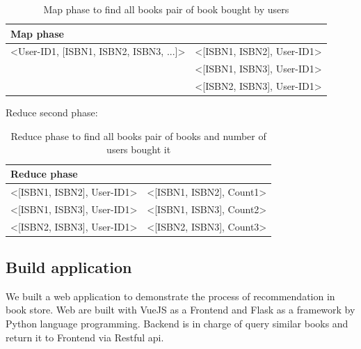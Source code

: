     \begin{table}[H]
        \centering
        \begin{tabular}{|l|l|}
            \hline
             \textbf{Map phase}      &  \\ \hline
             <User-ID1, [ISBN1, ISBN2, ISBN3, ...]> & <[ISBN1, ISBN2], User-ID1> \\
                               & <[ISBN1, ISBN3], User-ID1>\\
                               & <[ISBN2, ISBN3], User-ID1>\\ \hline
        \end{tabular}
        \caption{Map phase to find all books pair of book bought by users}
        \label{tab:my_label}
    \end{table}

Reduce second phase: 

    \begin{table}[H]
        \centering
        \begin{tabular}{|l|l|}
            \hline
            \textbf{Reduce phase} &  \\ \hline
             <[ISBN1, ISBN2], User-ID1> & <[ISBN1, ISBN2], Count1> \\
             <[ISBN1, ISBN3], User-ID1> & <[ISBN1, ISBN3], Count2> \\
             <[ISBN2, ISBN3], User-ID1> & <[ISBN2, ISBN3], Count3> \\ \hline
        \end{tabular}
        \caption{Reduce phase to find all books pair of books and number of users bought it}
        \label{tab:my_label}
    \end{table}



\subsection{Build application}

We built a web application to demonstrate the process of recommendation in book store. Web are built with VueJS as a Frontend and Flask as a framework by Python language programming. Backend is in charge of query similar books and return it to Frontend via Restful api.

